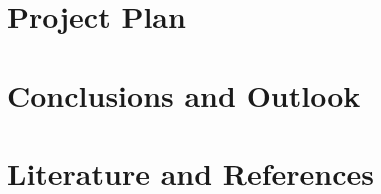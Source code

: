 \documentclass[11pt]{scrartcl}
\begin{document}
\section{Project Plan}



\section{Conclusions and Outlook}

\section{Literature and References}


\printbibliography
\end{document}
